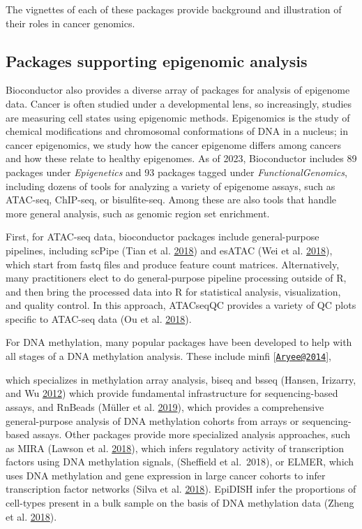 The vignettes of each of these packages provide background and
illustration of their roles in cancer genomics.

\subsection{Packages supporting epigenomic analysis}\label{packages-supporting-epigenomic-analysis}

Bioconductor also provides a diverse array of packages for analysis of epigenome
data. Cancer is often studied under a developmental lens, so increasingly, studies
are measuring cell states using epigenomic methods. Epigenomics is the study of
chemical modifications and chromosomal conformations of DNA in a nucleus; in cancer
epigenomics, we study how the cancer epigenome differs among cancers and how
these relate to healthy epigenomes. As of 2023, Bioconductor includes 89 packages
under \emph{Epigenetics} and 93 packages tagged under \emph{FunctionalGenomics}, including dozens of tools
for analyzing a variety of epigenome assays, such as ATAC-seq, ChIP-seq, or
bisulfite-seq. Among these are also tools that handle more general analysis, such
as genomic region set enrichment.

First, for ATAC-seq data, bioconductor packages include general-purpose pipelines, including scPipe
(Tian et al. \protect\hyperlink{ref-Tian2018}{2018})
and esATAC (Wei et al. \protect\hyperlink{ref-Wei2018}{2018}), which start from fastq files and produce feature count
matrices. Alternatively, many practitioners elect to do general-purpose pipeline processing outside of
R, and then bring the processed data into R for statistical analysis,
visualization, and quality control. In this approach, ATACseqQC
provides
a variety of QC plots specific to ATAC-seq data (Ou et al. \protect\hyperlink{ref-Ou2018}{2018}).

For DNA methylation, many popular packages have been developed to help with
all stages of a DNA methylation analysis. These include minfi {[}\href{mailto:Aryee@2014}{\nolinkurl{Aryee@2014}}{]},

\cite{Aryee2014}

which specializes in methylation array analysis, biseq and bsseq (Hansen, Irizarry, and Wu \protect\hyperlink{ref-Hansen2012}{2012})
which provide fundamental infrastructure for sequencing-based assays, and RnBeads
(Müller et al. \protect\hyperlink{ref-Mueller2019}{2019}), which provides a comprehensive general-purpose analysis of DNA
methylation cohorts from arrays or sequencing-based assays. Other packages provide more specialized
analysis approaches, such as MIRA (Lawson et al. \protect\hyperlink{ref-Lawson2018}{2018}), which infers regulatory
activity of transcription factors using DNA methylation signals, (Sheffield et al.~2018),
or ELMER, which uses DNA methylation and gene expression in large cancer
cohorts to infer transcription factor networks (Silva et al. \protect\hyperlink{ref-Silva2019}{2018}). EpiDISH infer
the proportions of cell-types present in a bulk sample on the basis
of DNA methylation data (Zheng et al. \protect\hyperlink{ref-Zheng2018a}{2018}).

